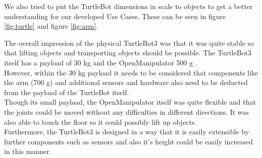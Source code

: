 \documentclass[plainarticle,zihtitle,english,final,hyperref,utf8]{zihpub}
\begin{document}
\label{fig:errorbringup}
\newline
We also tried to put the TurtleBot dimensions in scale to objects to get a better understanding for our developed Use Cases. These can be seen in figure \ref{fig:turtle} and figure \ref{fig:arm}.
\begin{table}[h!]
\centering
{}
\caption{Selected specifications of TurtleBot and OpenManipulator \cite{tbspecificiations}}
\label{tab:specifications}
\end{table}

The overall impression of the physical TurtleBot3 was that it was quite stable so that lifting objects and transporting objects should be possible. The TurtleBot3 itself has a payload of 30 kg and the OpenManipulator 500 g \cite{tbspecificiations}. \\
However, within the 30 kg payload it needs to be considered that components like the arm (700 g) and additional sensors and hardware also need to be deducted from the payload of the TurtleBot itself.\\
Though its small payload, the OpenManipulator itself was quite flexible and that the joints could be moved without any difficulties in different directions. It was also able to touch the floor so it could possibly lift up objects.\\
\newline
Furthermore, the TurtleBot3 is designed in a way that it is easily extensible by further components such as sensors and also it's height could be easily increased in this manner.
\end{document}
